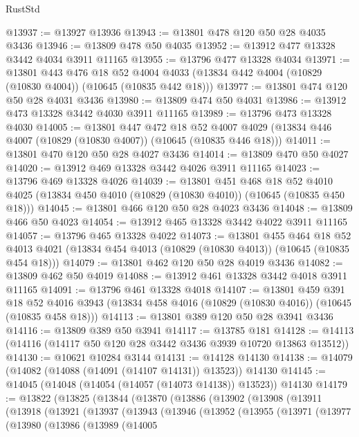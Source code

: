 \begin{lexlean}{RustStd}
\begin{coremodule}
@13937 := @13927 @13936
@13943 := @13801 @478 @120 @50 @28 @4035 @3436
@13946 := @13809 @478 @50 @4035
@13952 := @13912 @477 @13328 @3442 @4034 @3911 @11165
@13955 := @13796 @477 @13328 @4034
@13971 := @13801
    @443
    @476
    @18
    @52
    @4004
    @4033
    (@13834 @442 @4004 (@10829 (@10830 @4004)) (@10645 (@10835 @442 @18)))
@13977 := @13801 @474 @120 @50 @28 @4031 @3436
@13980 := @13809 @474 @50 @4031
@13986 := @13912 @473 @13328 @3442 @4030 @3911 @11165
@13989 := @13796 @473 @13328 @4030
@14005 := @13801
    @447
    @472
    @18
    @52
    @4007
    @4029
    (@13834 @446 @4007 (@10829 (@10830 @4007)) (@10645 (@10835 @446 @18)))
@14011 := @13801 @470 @120 @50 @28 @4027 @3436
@14014 := @13809 @470 @50 @4027
@14020 := @13912 @469 @13328 @3442 @4026 @3911 @11165
@14023 := @13796 @469 @13328 @4026
@14039 := @13801
    @451
    @468
    @18
    @52
    @4010
    @4025
    (@13834 @450 @4010 (@10829 (@10830 @4010)) (@10645 (@10835 @450 @18)))
@14045 := @13801 @466 @120 @50 @28 @4023 @3436
@14048 := @13809 @466 @50 @4023
@14054 := @13912 @465 @13328 @3442 @4022 @3911 @11165
@14057 := @13796 @465 @13328 @4022
@14073 := @13801
    @455
    @464
    @18
    @52
    @4013
    @4021
    (@13834 @454 @4013 (@10829 (@10830 @4013)) (@10645 (@10835 @454 @18)))
@14079 := @13801 @462 @120 @50 @28 @4019 @3436
@14082 := @13809 @462 @50 @4019
@14088 := @13912 @461 @13328 @3442 @4018 @3911 @11165
@14091 := @13796 @461 @13328 @4018
@14107 := @13801
    @459
    @391
    @18
    @52
    @4016
    @3943
    (@13834 @458 @4016 (@10829 (@10830 @4016)) (@10645 (@10835 @458 @18)))
@14113 := @13801 @389 @120 @50 @28 @3941 @3436
@14116 := @13809 @389 @50 @3941
@14117 := @13785 @181
@14128 := @14113 (@14116 (@14117 @50 @120 @28 @3442 @3436 @3939 @10720 @13863 @13512))
@14130 := @10621 @10284 @3144
@14131 := @14128 @14130
@14138 := @14079 (@14082 (@14088 (@14091 (@14107 @14131)) @13523)) @14130
@14145 := @14045 (@14048 (@14054 (@14057 (@14073 @14138)) @13523)) @14130
@14179 := @13822
    (@13825
      (@13844
        (@13870
          (@13886
            (@13902
              (@13908
                (@13911
                  (@13918
                    (@13921
                      (@13937
                        (@13943
                          (@13946
                            (@13952
                              (@13955
                                (@13971
                                  (@13977
                                    (@13980
                                      (@13986
                                        (@13989
                                          (@14005

\end{coremodule}
\end{lexlean}
